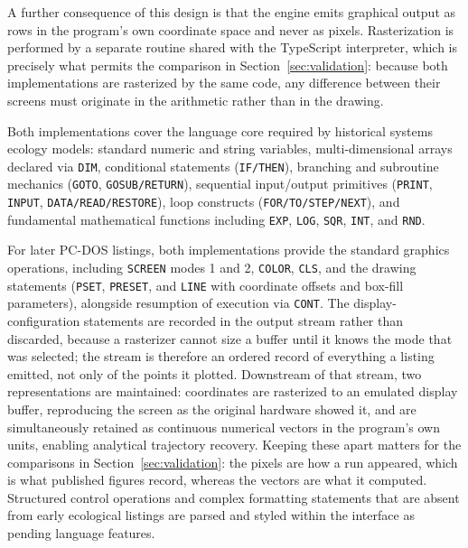 \documentclass[3p,times,authoryear,twocolumn]{elsarticle}
\begin{document}
A further consequence of this design is that the engine emits graphical output as rows in the program's own coordinate space and never as pixels. Rasterization is performed by a separate routine shared with the TypeScript interpreter, which is precisely what permits the comparison in Section~\ref{sec:validation}: because both implementations are rasterized by the same code, any difference between their screens must originate in the arithmetic rather than in the drawing.

Both implementations cover the language core required by historical systems ecology models: standard numeric and string variables, multi-dimensional arrays declared via \texttt{DIM}, conditional statements (\texttt{IF/THEN}), branching and subroutine mechanics (\texttt{GOTO}, \texttt{GOSUB/RETURN}), sequential input/output primitives (\texttt{PRINT}, \texttt{INPUT}, \texttt{DATA/READ/RESTORE}), loop constructs (\texttt{FOR/TO/STEP/NEXT}), and fundamental mathematical functions including \texttt{EXP}, \texttt{LOG}, \texttt{SQR}, \texttt{INT}, and \texttt{RND}.

For later PC-DOS listings, both implementations provide the standard graphics operations, including \texttt{SCREEN} modes 1 and 2, \texttt{COLOR}, \texttt{CLS}, and the drawing statements (\texttt{PSET}, \texttt{PRESET}, and \texttt{LINE} with coordinate offsets and box-fill parameters), alongside resumption of execution via \texttt{CONT}. The display-configuration statements are recorded in the output stream rather than discarded, because a rasterizer cannot size a buffer until it knows the mode that was selected; the stream is therefore an ordered record of everything a listing emitted, not only of the points it plotted. Downstream of that stream, two representations are maintained: coordinates are rasterized to an emulated display buffer, reproducing the screen as the original hardware showed it, and are simultaneously retained as continuous numerical vectors in the program's own units, enabling analytical trajectory recovery. Keeping these apart matters for the comparisons in Section~\ref{sec:validation}: the pixels are how a run appeared, which is what published figures record, whereas the vectors are what it computed. Structured control operations and complex formatting statements that are absent from early ecological listings are parsed and styled within the interface as pending language features.
\end{document}

